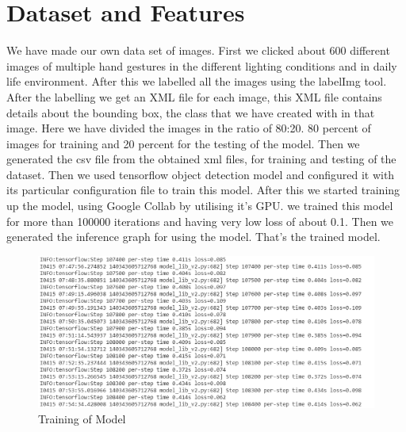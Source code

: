 \documentclass[12pt]{article}
\begin{document}
\section{Dataset and Features}
We have made our own data set of images. First we clicked about 600 different images of multiple hand gestures in the different lighting conditions and in daily life environment. After this we labelled all the images using the labelImg tool. After the labelling we get an XML file for each image, this XML file contains details about the bounding box, the class that we have created with in that image. Here we have divided the images in the ratio of 80:20. 80 percent of images for training and 20 percent for the testing of the model. Then we generated the csv file from the obtained xml files, for training and testing of the dataset. Then we used tensorflow object detection model and configured it with its particular configuration file to train this model. After this we started training up the model, using Google Collab by utilising it's GPU. we trained this model for more than 100000 iterations and having very low loss of about 0.1. Then we generated the inference graph for using the model. That's the trained model.
\begin{figure}[h]
\centering
\includegraphics[scale=0.48]{training.PNG}
\caption{Training of Model}
\label{training.PNG}
\end{figure}
\end{document}
